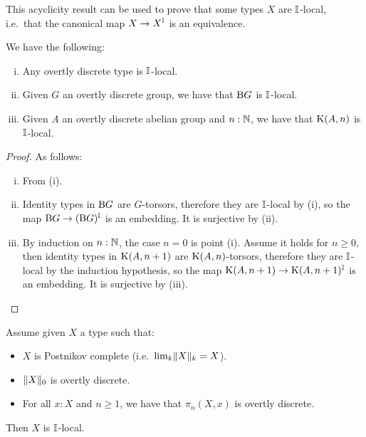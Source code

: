 This acyclicity result can be used to prove that some types $X$ are $\mathbb{I}$-local, i.e.\ that the canonical map $X\to X^{\mathbb{I}}$ is an equivalence.

\begin{lemma}\label{delooping-I-local}
We have the following:

\begin{enumerate}[(i)]
\item Any overtly discrete type is $\mathbb{I}$-local.
\item Given $G$ an overtly discrete group, we have that $\mathrm{B} G$ is $\mathbb{I}$-local.
\item Given $A$ an overtly discrete abelian group and $n:\mathbb{N}$, we have that ${\mathrm{K}}(A,n)$ is $\mathbb{I}$-local.
\end{enumerate}
\end{lemma}

\begin{proof}
As follows:

\begin{enumerate}[(i)]
\item From (i).
\item Identity types in $\mathrm{B} G$ are $G$-torsors, therefore they are $\mathbb{I}$-local by (i), so the map $\mathrm{B} G\to (\mathrm{B} G)^{\mathbb{I}}$ is an embedding. It is surjective by (ii).
\item By induction on $n:\mathbb{N}$, the case $n=0$ is point (i). Assume it holds for $n\geq 0$, then identity types in ${\mathrm{K}}(A,n+1)$ are ${\mathrm{K}}(A,n)$-torsors, therefore they are $\mathbb{I}$-local by the induction hypothesis, so the map ${\mathrm{K}}(A,n+1)\to {\mathrm{K}}(A,n+1)^{\mathbb{I}}$ is an embedding. It is surjective by (iii).
\end{enumerate} 
\end{proof}

\begin{proposition}\label{postnikov-I-local}
Assume given $X$ a type such that:

\begin{itemize}
\item $X$ is Postnikov complete (i.e.\ $\mathrm{lim}_k\lVert X \rVert_k = X$).
\item $\lVert X \rVert_0$ is overtly discrete.
\item For all $x:X$ and $n\geq 1$, we have that $\pi_n(X,x)$ is overtly discrete.
\end{itemize}
Then $X$ is $\mathbb{I}$-local.
\end{proposition}

